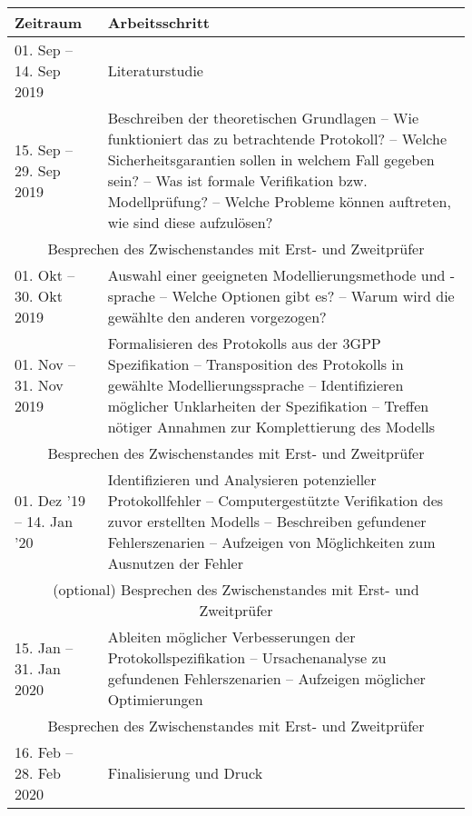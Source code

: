 \begin{table}[ht!]
\centering
\begin{tabular}{p{}|p{}}
\textbf{Zeitraum} & \textbf{Arbeitsschritt}\\\hline
01. Sep -- 14. Sep 2019 & Literaturstudie\\\hline
15. Sep -- 29. Sep 2019 & Beschreiben der theoretischen Grundlagen\newline
-- Wie funktioniert das zu betrachtende Protokoll?\newline
-- Welche Sicherheitsgarantien sollen in welchem Fall gegeben sein?\newline
-- Was ist formale Verifikation bzw. Modellprüfung?\newline
-- Welche Probleme können auftreten, wie sind diese aufzulösen?\\\hline\hline
\multicolumn{2}{c}{Besprechen des Zwischenstandes mit Erst- und Zweitprüfer}\\\hline\hline
01. Okt -- 30. Okt 2019 & Auswahl einer geeigneten Modellierungsmethode und -sprache\newline
-- Welche Optionen gibt es?\newline
-- Warum wird die gewählte den anderen vorgezogen?\\\hline
01. Nov -- 31. Nov 2019 & Formalisieren des Protokolls aus der 3GPP Spezifikation\newline
-- Transposition des Protokolls in gewählte Modellierungssprache\newline
-- Identifizieren möglicher Unklarheiten der Spezifikation\newline
-- Treffen nötiger Annahmen zur Komplettierung des Modells\\\hline\hline
\multicolumn{2}{c}{Besprechen des Zwischenstandes mit Erst- und Zweitprüfer}\\\hline\hline
01. Dez '19 -- 14. Jan '20 & Identifizieren und Analysieren potenzieller Protokollfehler\newline
-- Computergestützte Verifikation des zuvor erstellten Modells\newline
-- Beschreiben gefundener Fehlerszenarien\newline
-- Aufzeigen von Möglichkeiten zum Ausnutzen der Fehler\\\hline\hline
\multicolumn{2}{c}{(optional) Besprechen des Zwischenstandes mit Erst- und Zweitprüfer}\\\hline\hline
15. Jan -- 31. Jan 2020 & Ableiten möglicher Verbesserungen der Protokollspezifikation\newline
-- Ursachenanalyse zu gefundenen Fehlerszenarien\newline
-- Aufzeigen möglicher Optimierungen\\\hline\hline
\multicolumn{2}{c}{Besprechen des Zwischenstandes mit Erst- und Zweitprüfer}\\\hline\hline
16. Feb -- 28. Feb 2020 & Finalisierung und Druck
\end{tabular}
\end{table}